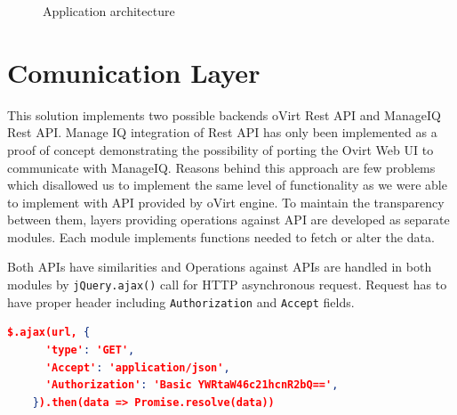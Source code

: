 \begin{figure}[h]
\caption{Application architecture}
\label{vector}
\end{figure}

\section{Comunication Layer}
This solution implements two possible backends oVirt Rest API and ManageIQ Rest API. Manage IQ integration of Rest API has only been implemented as a proof of concept demonstrating the possibility of porting the Ovirt Web UI to communicate with ManageIQ. Reasons behind this approach are few problems which disallowed us to implement the same level of functionality as we were able to implement with API provided by oVirt engine. To maintain the transparency between them, layers providing operations against API are developed as separate modules. Each module implements functions needed to fetch or alter the data.

Both APIs have similarities and Operations against APIs are handled in both modules by \texttt{jQuery.ajax()}\cite{ajax} call for HTTP asynchronous request.
Request has to have proper header including \texttt{Authorization} and \texttt{Accept} fields. 

\bigskip
\begin{lstlisting}[language=json,xleftmargin=3.5ex,caption={Fetching data from ManageIQ with Basic Authentication},captionpos=b]
$.ajax(url, {
      'type': 'GET',
      'Accept': 'application/json',
      'Authorization': 'Basic YWRtaW46c21hcnR2bQ==',
    }).then(data => Promise.resolve(data))
\end{lstlisting}\label{base}
\bigskip

